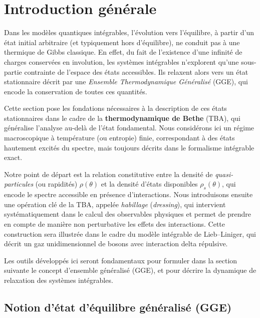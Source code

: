 \section*{Introduction générale}

Dans les modèles quantiques intégrables, l’évolution vers l’équilibre, à partir d’un état initial arbitraire (et typiquement hors d’équilibre), ne conduit pas à une thermique de Gibbs classique.  
En effet, du fait de l’existence d’une infinité de charges conservées en involution, les systèmes intégrables n’explorent qu’une sous-partie contrainte de l’espace des états accessibles.  
Ils relaxent alors vers un état stationnaire décrit par une \emph{Ensemble Thermodynamique Généralisé} (GGE), qui encode la conservation de toutes ces quantités.

Cette section pose les fondations nécessaires à la description de ces états stationnaires dans le cadre de la \textbf{thermodynamique de Bethe} (TBA), qui généralise l’analyse au-delà de l’état fondamental.  
Nous considérons ici un régime macroscopique à température (ou entropie) finie, correspondant à des états hautement excités du spectre, mais toujours décrits dans le formalisme intégrable exact.

Notre point de départ est la relation constitutive entre la densité de \emph{quasi-particules} (ou rapidités) $\rho(\theta)$ et la densité d’états disponibles $\rho_s(\theta)$, qui encode le spectre accessible en présence d’interactions.  
Nous introduisons ensuite une opération clé de la TBA, appelée \emph{habillage} (\emph{dressing}), qui intervient systématiquement dans le calcul des observables physiques et permet de prendre en compte de manière non perturbative les effets des interactions.  
Cette construction sera illustrée dans le cadre du modèle intégrable de Lieb–Liniger, qui décrit un gaz unidimensionnel de bosons avec interaction delta répulsive.

Les outils développés ici seront fondamentaux pour formuler dans la section suivante le concept d’ensemble généralisé (GGE), et pour décrire la dynamique de relaxation des systèmes intégrables.



\subsection{Notion d’état d’équilibre généralisé (GGE)}

